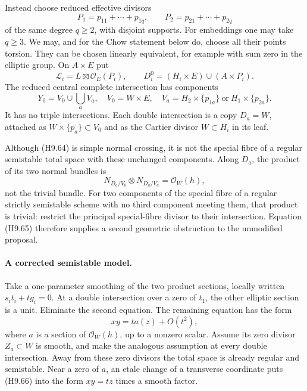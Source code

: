 \documentclass[11pt,a4paper]{article}
\begin{document}
Instead choose reduced effective divisors
\[
 P_1=p_{11}+\cdots+p_{1q},\qquad
 P_2=p_{21}+\cdots+p_{2q}
\]
of the same degree $q\ge2$, with disjoint supports. For embeddings
one may take $q\ge3$. We may, and for the Chow statement below do,
choose all their points torsion. They can be chosen linearly
 equivalent, for example with sum zero in the elliptic group.
On $A\times E$ put
\[
 \mathcal L_i=L\boxtimes\mathcal O_E(P_i),\qquad
 D_i^0=(H_i\times E)\cup(A\times P_i).
\]
The reduced central complete intersection has components
\[
 Y_0=V_0\cup\bigcup_a V_a,
 \quad V_0=W\times E,
 \quad V_a=H_2\times\{p_{1a}\}\ \text{or}\ H_1\times\{p_{2a}\}.
                                                               \tag{H9.64}
\]
It has no triple intersections. Each double intersection is a copy
$D_a=W$, attached as $W\times\{p_a\}\subset V_0$ and as the
Cartier divisor $W\subset H_i$ in its leaf.

Although (H9.64) is simple normal crossing, it is not the special
fibre of a regular semistable total space with these unchanged
components. Along $D_a$, the product of its two normal bundles is
\[
 N_{D_a/V_0}\otimes N_{D_a/V_a}=\mathcal O_W(h),             \tag{H9.65}
\]
not the trivial bundle. For two components of the special fibre of
a regular strictly semistable scheme with no third component
meeting them, that product is trivial: restrict the principal
special-fibre divisor to their intersection. Equation (H9.65)
therefore supplies a second geometric obstruction to the unmodified
proposal.

\paragraph{A corrected semistable model.}
Take a one-parameter smoothing of the two product sections,
locally written $s_i t_i+t g_i=0$. At a double intersection over a
zero of $t_1$, the other elliptic section is a unit. Eliminate the
second equation. The remaining equation has the form
\[
                         xy=t a(z)+O(t^2),                 \tag{H9.66}
\]
where $a$ is a section of $\mathcal O_W(h)$, up to a nonzero scalar.
Assume its zero divisor $Z_a\subset W$ is smooth, and make the
analogous assumption at every double intersection. Away from these
zero divisors the total space is already regular and semistable.
Near a zero of $a$, an etale change of a transverse coordinate puts
(H9.66) into the form $xy=tz$ times a smooth factor.
\end{document}
